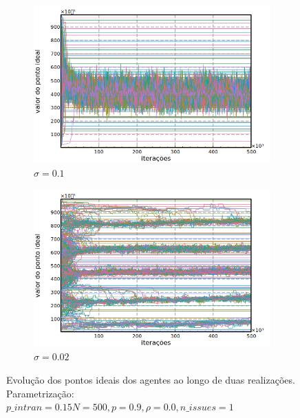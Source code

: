 \begin{figure}[h]
    \centering
    \begin{subfigure}[b]{0.49\textwidth}
      \includegraphics[width=\textwidth]{ims/timeseries3.png}
      \caption{\( \sigma = 0.1\) }
    \end{subfigure}
    \begin{subfigure}[b]{0.49\textwidth}
      \includegraphics[width=\textwidth]{ims/timeseries4.png}
       \caption{\(\sigma = 0.02\) }
      \end{subfigure}
      \caption{Evolução dos pontos ideais dos agentes ao longo de duas realizações.
        Parametrização: \(p\_intran = 0.15 N = 500, p = 0.9, \rho = 0.0, n\_issues = 1 \)}
      \label{fig:tseries2}
    \end{figure}
    



